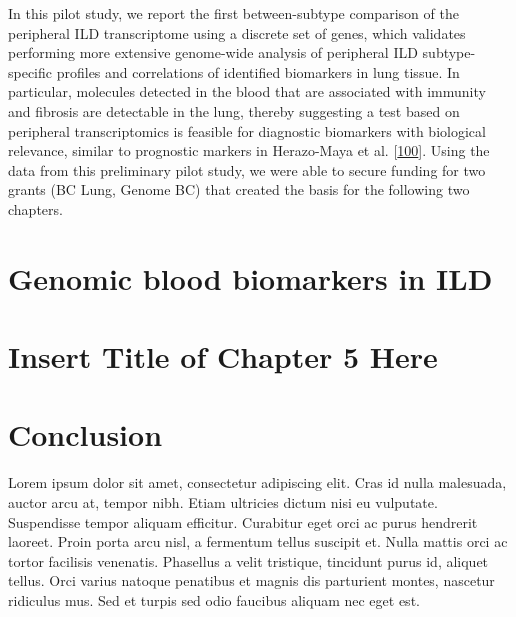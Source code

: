 \documentclass[
]{article}
\begin{document}
In this pilot study, we report the first between-subtype comparison of the peripheral ILD transcriptome using a discrete set of genes, which validates performing more extensive genome-wide analysis of peripheral ILD subtype-specific profiles and correlations of identified biomarkers in lung tissue. In particular, molecules detected in the blood that are associated with immunity and fibrosis are detectable in the lung, thereby suggesting a test based on peripheral transcriptomics is feasible for diagnostic biomarkers with biological relevance, similar to prognostic markers in Herazo-Maya et al. {[}\protect\hyperlink{ref-herazo-maya_validating_2017}{100}{]}. Using the data from this preliminary pilot study, we were able to secure funding for two grants (BC Lung, Genome BC) that created the basis for the following two chapters.

\clearpage

\hypertarget{genomic-blood-biomarkers-in-ild}{%
\section{Genomic blood biomarkers in ILD}\label{genomic-blood-biomarkers-in-ild}}

\renewcommand{\thefigure}{4.\arabic{figure}}
\setcounter{figure}{0}
\renewcommand{\thetable}{4.\arabic{table}}
\setcounter{table}{0}
\renewcommand{\theequation}{4.\arabic{equation}}
\setcounter{equation}{0}

\clearpage

\hypertarget{insert-title-of-chapter-5-here}{%
\section{Insert Title of Chapter 5 Here}\label{insert-title-of-chapter-5-here}}

\renewcommand{\thefigure}{5.\arabic{figure}}
\setcounter{figure}{0}
\renewcommand{\thetable}{5.\arabic{table}}
\setcounter{table}{0}
\renewcommand{\theequation}{5.\arabic{equation}}
\setcounter{equation}{0}

\clearpage

\hypertarget{conclusion}{%
\section{Conclusion}\label{conclusion}}

Lorem ipsum dolor sit amet, consectetur adipiscing elit. Cras id nulla malesuada, auctor arcu at, tempor nibh. Etiam ultricies dictum nisi eu vulputate. Suspendisse tempor aliquam efficitur. Curabitur eget orci ac purus hendrerit laoreet. Proin porta arcu nisl, a fermentum tellus suscipit et. Nulla mattis orci ac tortor facilisis venenatis. Phasellus a velit tristique, tincidunt purus id, aliquet tellus. Orci varius natoque penatibus et magnis dis parturient montes, nascetur ridiculus mus. Sed et turpis sed odio faucibus aliquam nec eget est.
\end{document}
